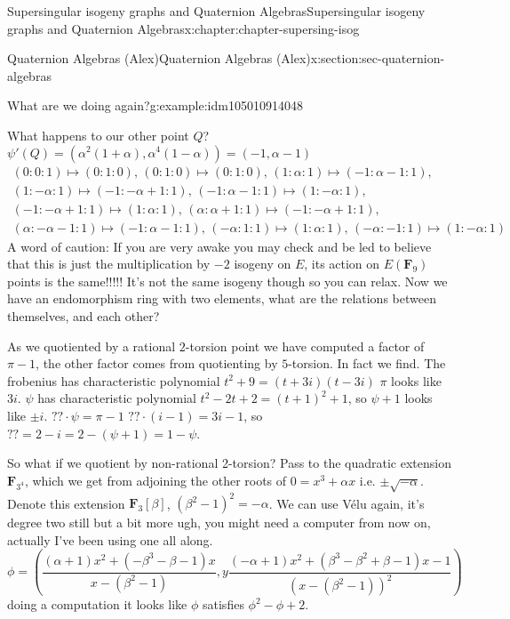\documentclass[oneside,10pt,]{book}
\numberwithin{equation}{section}
\newcommand{\lb}{[}
\newcommand{\rb}{]}
\newcommand{\FF}{\mathbf{F}}
\begin{document}
\begin{chapterptx}{Supersingular isogeny graphs and Quaternion Algebras}{}{Supersingular isogeny graphs and Quaternion Algebras}{}{}{x:chapter:chapter-supersing-isog}
\begin{sectionptx}{Quaternion Algebras (Alex)}{}{Quaternion Algebras (Alex)}{}{}{x:section:sec-quaternion-algebras}
\begin{introduction}{}
\begin{example}{What are we doing again?}{g:example:idm105010914048}
%
\par
What happens to our other point \(Q\)? \(\psi'(Q) = (\alpha^2(1+\alpha), \alpha^4(1-\alpha)) =(-1, \alpha - 1)\)%
\begin{gather*}
(0 : 0 : 1) \mapsto (0 : 1 : 0),\, (0 : 1 : 0) \mapsto (0 : 1 : 0),\, (1 : \alpha : 1) \mapsto (-1 : \alpha -1 : 1),\\
(1 : -\alpha : 1) \mapsto (-1 : -\alpha + 1 : 1),\, (-1 : \alpha -1 : 1) \mapsto (1 : -\alpha : 1),\\
(-1 : -\alpha + 1 : 1) \mapsto (1 : \alpha : 1),\, (\alpha : \alpha + 1 : 1) \mapsto (-1 : -\alpha + 1 : 1),\\
(\alpha : -\alpha -1 : 1) \mapsto (-1 : \alpha -1 : 1),\, (-\alpha : 1 : 1) \mapsto (1 : \alpha : 1),\, (-\alpha : -1 : 1) \mapsto (1 : -\alpha : 1)
\end{gather*}
A word of caution: If you are very awake you may check and be led to believe that this is just the multiplication by \(-2\) isogeny on \(E\), its action on \(E(\FF_9)\) points is the same!!!!! It's not the same isogeny though so you can relax. Now we have an endomorphism ring with two elements, what are the relations between themselves, and each other?%
\par
As we quotiented by a rational \(2\)-torsion point we have computed a factor of \(\pi - 1\), the other factor comes from quotienting by \(5\)-torsion. In fact we find. The frobenius has characteristic polynomial \(t^2 + 9 = (t + 3i)(t-3i)\) \(\pi\) looks like \(3i\). \(\psi\) has characteristic polynomial \(t^2 - 2t + 2 = (t+1)^2 + 1\), so \(\psi + 1\) looks like \(\pm i\). \(?? \cdot \psi = \pi - 1\)  \(?? \cdot (i - 1) = 3i - 1\), so \(?? = 2 - i = 2 - (\psi + 1) = 1 - \psi\).%
\par
So what if we quotient by non-rational 2-torsion? Pass to the quadratic extension \(\FF_{3^4}\), which we get from adjoining the other roots of \(0 = x^3 + \alpha x\) i.e. \(\pm \sqrt{-\alpha}\). Denote this extension \(\FF_3 \lb \beta \rb\),  \((\beta^2 - 1)^2 = -\alpha\). We can use Vélu again, it's degree two still but a bit more ugh, you might need a computer from now on, actually I've been using one all along.%
\begin{equation*}
\phi = \left( \frac{\left(\alpha + 1\right) x^{2} + \left(- \beta^{3}  -  \beta - 1\right) x}{x -   (\beta^{2} - 1)},y \frac{\left(-\alpha + 1\right) x^{2} + \left(\beta^{3}  -  \beta^{2} + \beta - 1\right) x -  1}{(x -  ( \beta^{2} - 1))^2} \right)
\end{equation*}
doing a computation it looks like \(\phi\) satisfies \(\phi^2 -\phi + 2\).%

\end{example}
\end{introduction}
\end{sectionptx}
\end{chapterptx}
\end{document}
